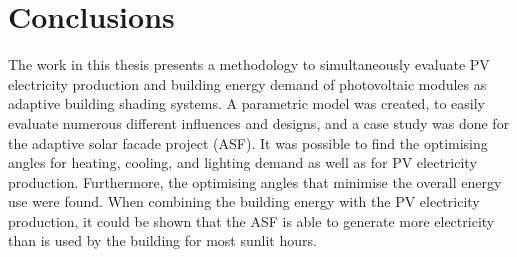 \chapter{Conclusions}
\label{ch:conclusion}






The work in this thesis presents a methodology to simultaneously evaluate PV electricity production and building energy demand of photovoltaic modules as adaptive building shading systems. A parametric model was created, to easily evaluate numerous different influences and designs, and a case study was done for the adaptive solar facade project (ASF). It was possible to find the optimising angles for heating, cooling, and lighting demand as well as for PV electricity production. Furthermore, the optimising angles that minimise the overall energy use were found. When combining the building energy with the PV electricity production, it could be shown that the ASF is able to generate more electricity than is used by the building for most sunlit hours. 

